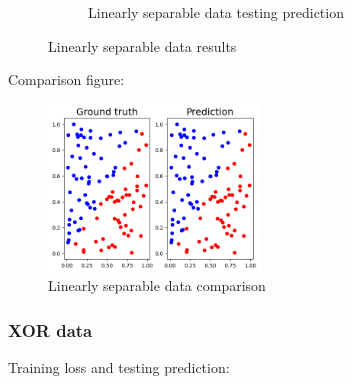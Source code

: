 \documentclass{homework}
\begin{document}
\begin{figure}[H]
\begin{subfigure}{0.45\textwidth}
        \caption{Linearly separable data testing prediction}
    \end{subfigure}
    \caption{Linearly separable data results}
\end{figure}

Comparison figure:

\begin{figure}[H]
    \centering
    \centering
    \includegraphics[width=0.5\textwidth]{linear_compare.png}
    \caption{Linearly separable data comparison}
\end{figure}

\subsubsection{XOR data}

Training loss and testing prediction:
\end{document}
